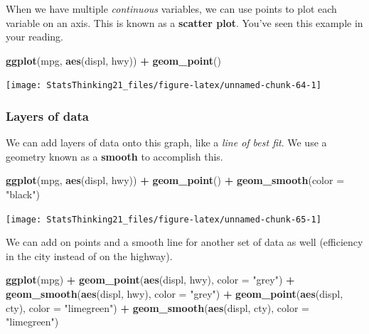 \documentclass[
  12pt,
]{book}
\newenvironment{Shaded}{\begin{snugshade}}{\end{snugshade}}
\newcommand{\AttributeTok}[1]{\textcolor[rgb]{0.13,0.29,0.53}{#1}}
\newcommand{\FunctionTok}[1]{\textcolor[rgb]{0.13,0.29,0.53}{\textbf{#1}}}
\newcommand{\NormalTok}[1]{#1}
\newcommand{\SpecialCharTok}[1]{\textcolor[rgb]{0.81,0.36,0.00}{\textbf{#1}}}
\newcommand{\StringTok}[1]{\textcolor[rgb]{0.31,0.60,0.02}{#1}}
\begin{document}
When we have multiple \emph{continuous} variables, we can use points to plot each variable on an axis. This is known as a \textbf{scatter plot}. You've seen this example in your reading.

\begin{Shaded}
\begin{Highlighting}[]
\FunctionTok{ggplot}\NormalTok{(mpg, }\FunctionTok{aes}\NormalTok{(displ, hwy)) }\SpecialCharTok{+}
  \FunctionTok{geom\_point}\NormalTok{()}
\end{Highlighting}
\end{Shaded}

\texttt{[image: StatsThinking21\_files/figure-latex/unnamed-chunk-64-1]}

\hypertarget{layers-of-data}{%
\subsubsection{Layers of data}\label{layers-of-data}}

We can add layers of data onto this graph, like a \emph{line of best fit}. We use a geometry known as a \textbf{smooth} to accomplish this.

\begin{Shaded}
\begin{Highlighting}[]
\FunctionTok{ggplot}\NormalTok{(mpg, }\FunctionTok{aes}\NormalTok{(displ, hwy)) }\SpecialCharTok{+}
  \FunctionTok{geom\_point}\NormalTok{() }\SpecialCharTok{+}
  \FunctionTok{geom\_smooth}\NormalTok{(}\AttributeTok{color =} \StringTok{"black"}\NormalTok{)}
\end{Highlighting}
\end{Shaded}

\texttt{[image: StatsThinking21\_files/figure-latex/unnamed-chunk-65-1]}

We can add on points and a smooth line for another set of data as well (efficiency in the city instead of on the highway).

\begin{Shaded}
\begin{Highlighting}[]
\FunctionTok{ggplot}\NormalTok{(mpg) }\SpecialCharTok{+}
  \FunctionTok{geom\_point}\NormalTok{(}\FunctionTok{aes}\NormalTok{(displ, hwy), }\AttributeTok{color =} \StringTok{"grey"}\NormalTok{) }\SpecialCharTok{+}
  \FunctionTok{geom\_smooth}\NormalTok{(}\FunctionTok{aes}\NormalTok{(displ, hwy), }\AttributeTok{color =} \StringTok{"grey"}\NormalTok{) }\SpecialCharTok{+}
  \FunctionTok{geom\_point}\NormalTok{(}\FunctionTok{aes}\NormalTok{(displ, cty), }\AttributeTok{color =} \StringTok{"limegreen"}\NormalTok{) }\SpecialCharTok{+}
  \FunctionTok{geom\_smooth}\NormalTok{(}\FunctionTok{aes}\NormalTok{(displ, cty), }\AttributeTok{color =} \StringTok{"limegreen"}\NormalTok{)}
\end{Highlighting}
\end{Shaded}
\end{document}
